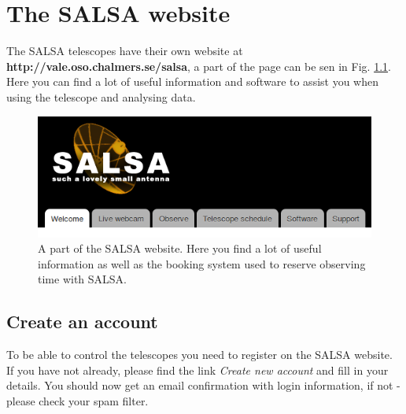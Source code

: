 \chapter{The SALSA website}
The SALSA telescopes have their own website at {\bf http://vale.oso.chalmers.se/salsa},
a part of the page can be sen in Fig. \ref{fig:website}. 
Here you can find a lot of useful information and software to assist you when using
the telescope and analysing data. 
\begin{figure}[h]
\centering
\includegraphics[width=\textwidth]{../figures/SALSA_website.png}
\caption{\label{fig:website} A part of the SALSA website. Here you find a
	lot of useful information as well as the booking system used to reserve
	observing time with SALSA.}
\end{figure}

\section{Create an account}
To be able to control the telescopes you need to 
register on the SALSA website. If you have not already, please find the link 
\emph{Create new account} and fill in your details. You should now get an email
confirmation with login information, if not - please check your spam filter.

